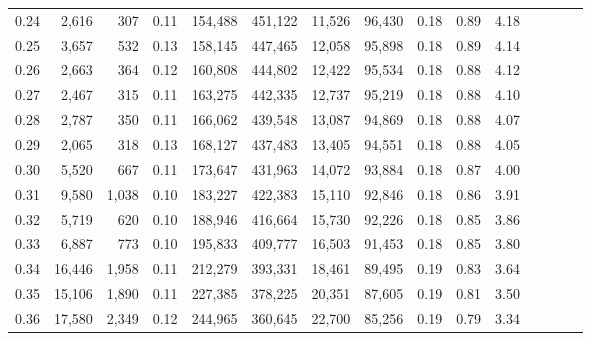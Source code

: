 \begin{tabular}{rrrcrrrrrrrrrrr}
0.24 &   2,616 &    307 &                                       0.11 &  154,488 &  451,122 &   11,526 &   96,430 &  0.18 &  0.89 &                         4.18 \\
0.25 &   3,657 &    532 &                                       0.13 &  158,145 &  447,465 &   12,058 &   95,898 &  0.18 &  0.89 &                         4.14 \\
0.26 &   2,663 &    364 &                                       0.12 &  160,808 &  444,802 &   12,422 &   95,534 &  0.18 &  0.88 &                         4.12 \\
0.27 &   2,467 &    315 &                                       0.11 &  163,275 &  442,335 &   12,737 &   95,219 &  0.18 &  0.88 &                         4.10 \\
0.28 &   2,787 &    350 &                                       0.11 &  166,062 &  439,548 &   13,087 &   94,869 &  0.18 &  0.88 &                         4.07 \\
0.29 &   2,065 &    318 &                                       0.13 &  168,127 &  437,483 &   13,405 &   94,551 &  0.18 &  0.88 &                         4.05 \\
0.30 &   5,520 &    667 &                                       0.11 &  173,647 &  431,963 &   14,072 &   93,884 &  0.18 &  0.87 &                         4.00 \\
0.31 &   9,580 &  1,038 &                                       0.10 &  183,227 &  422,383 &   15,110 &   92,846 &  0.18 &  0.86 &                         3.91 \\
0.32 &   5,719 &    620 &                                       0.10 &  188,946 &  416,664 &   15,730 &   92,226 &  0.18 &  0.85 &                         3.86 \\
0.33 &   6,887 &    773 &                                       0.10 &  195,833 &  409,777 &   16,503 &   91,453 &  0.18 &  0.85 &                         3.80 \\
0.34 &  16,446 &  1,958 &                                       0.11 &  212,279 &  393,331 &   18,461 &   89,495 &  0.19 &  0.83 &                         3.64 \\
0.35 &  15,106 &  1,890 &                                       0.11 &  227,385 &  378,225 &   20,351 &   87,605 &  0.19 &  0.81 &                         3.50 \\
0.36 &  17,580 &  2,349 &                                       0.12 &  244,965 &  360,645 &   22,700 &   85,256 &  0.19 &  0.79 &                         3.34 \\

\end{tabular}

